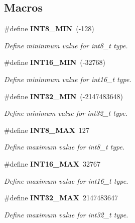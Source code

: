\subsection*{Macros}
\begin{DoxyCompactItemize}
\item 
\mbox{\label{stdint_8h_aadcf2a81af243df333b31efa6461ab8e}} 
\#define \textbf{ I\+N\+T8\+\_\+\+M\+IN}~(-\/128)
\begin{DoxyCompactList}\small\item\em Define mininmum value for int8\+\_\+t type. \end{DoxyCompactList}\item 
\mbox{\label{stdint_8h_ad4e9955955b27624963643eac448118a}} 
\#define \textbf{ I\+N\+T16\+\_\+\+M\+IN}~(-\/32768)
\begin{DoxyCompactList}\small\item\em Define mininmum value for int16\+\_\+t type. \end{DoxyCompactList}\item 
\mbox{\label{stdint_8h_a688eb21a22db27c2b2bd5836943cdcbe}} 
\#define \textbf{ I\+N\+T32\+\_\+\+M\+IN}~(-\/2147483648)
\begin{DoxyCompactList}\small\item\em Define minimum value for int32\+\_\+t type. \end{DoxyCompactList}\item 
\mbox{\label{stdint_8h_aaf7f29f45f1a513b4748a4e5014ddf6a}} 
\#define \textbf{ I\+N\+T8\+\_\+\+M\+AX}~127
\begin{DoxyCompactList}\small\item\em Define maximum value for int8\+\_\+t type. \end{DoxyCompactList}\item 
\mbox{\label{stdint_8h_ac58f2c111cc9989c86db2a7dc4fd84ca}} 
\#define \textbf{ I\+N\+T16\+\_\+\+M\+AX}~32767
\begin{DoxyCompactList}\small\item\em Define maximum value for int16\+\_\+t type. \end{DoxyCompactList}\item 
\mbox{\label{stdint_8h_a181807730d4a375f848ba139813ce04f}} 
\#define \textbf{ I\+N\+T32\+\_\+\+M\+AX}~2147483647
\begin{DoxyCompactList}\small\item\em Define maximum value for int32\+\_\+t type. \end{DoxyCompactList}\item 
\mbox{\label{stdint_8h_aeb4e270a084ee26fe73e799861bd0252}} 

\end{DoxyCompactItemize}
